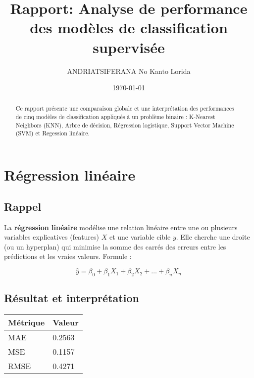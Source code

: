 \documentclass[a4paper,11pt]{article}
\title{Rapport: Analyse de performance des modèles de classification supervisée }
\author{ANDRIATSIFERANA No Kanto Lorida}
\date{\today}
\begin{document}
	\vspace{1.5cm}
	\maketitle
	\begin{abstract}
		Ce rapport présente une comparaison globale et une interprétation des performances de cinq modèles de classification appliqués à un problème binaire : K-Nearest Neighbors (KNN), Arbre de décision, Régression logistique, Support Vector Machine (SVM) et Regession linéaire. 
	\end{abstract}
	\newpage
	\vspace{1.5cm}
	\section{Régression linéaire}
	\subsection{Rappel}
		\indent
		La \textbf{régression linéaire} modélise une relation linéaire entre une ou plusieurs variables explicatives (features) $X$ et une variable cible $y$. Elle cherche une droite (ou un hyperplan) qui minimise la somme des carrés des erreurs entre les prédictions et les vraies valeurs.
		Formule :
		
		$$
		\hat{y} = \beta_0 + \beta_1 X_1 + \beta_2 X_2 + \dots + \beta_n X_n
		$$
	
	\subsection{Résultat et interprétation}
	\begin{center}
		\begin{tabular}{|l|l|}
			\hline
			\textbf{Métrique} & \textbf{Valeur}  \\
			\hline
			MAE & 0.2563 \\
			\hline
			MSE & 0.1157 \\
			\hline
			RMSE & 0.4271 \\
			\hline
		\end{tabular}
	\end{center}
	
\end{document}

